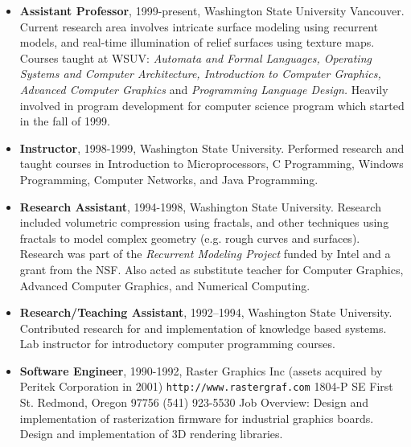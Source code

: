 \documentclass[12pt]{article}
\begin{document}
\begin{itemize}

\item {\bf Assistant Professor}, 1999-present,
Washington State University Vancouver.
Current research area involves intricate surface modeling
using recurrent models, and real-time illumination of
relief surfaces using texture maps.
Courses taught at WSUV:
{\em Automata and Formal Languages, Operating Systems and
Computer Architecture, Introduction to Computer Graphics,
Advanced Computer Graphics} and {\em Programming Language Design.}
Heavily involved in program development for 
computer science program which started in the fall of 1999.

\item {\bf Instructor}, 1998-1999,
Washington State University. Performed research and taught
courses in Introduction to Microprocessors, C Programming,
Windows Programming, Computer Networks, and Java Programming.

\item {\bf Research Assistant}, 1994-1998,
Washington State University.
Research included volumetric compression using fractals,
and other techniques using fractals to model complex geometry
(e.g. rough curves and surfaces). Research was part of the
{\em Recurrent Modeling Project} funded by Intel and a grant
from the NSF.
Also acted as substitute teacher for Computer Graphics, 
Advanced Computer Graphics, and Numerical Computing. 

\item {\bf Research/Teaching Assistant}, 1992--1994, 
Washington State University.
Contributed research for and implementation of knowledge based systems.
Lab instructor for
introductory computer programming courses.

\item {\bf Software Engineer}, 1990-1992,
Raster Graphics Inc
(assets acquired by Peritek Corporation in 2001)
{\tt http://www.rastergraf.com}
1804-P SE First St.
Redmond, Oregon 97756
(541) 923-5530
Job Overview: 
Design and implementation of rasterization firmware for
industrial graphics boards. Design and implementation of
3D rendering libraries.
\end{itemize}

\vspace{0.25cm}


\end{document}
